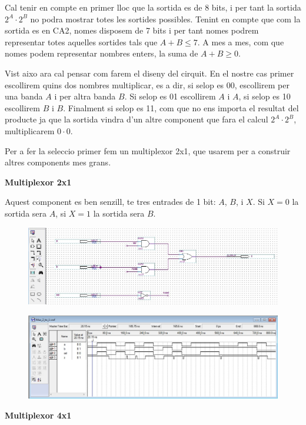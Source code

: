 \documentclass[12pt, a4papre]{article}
\begin{document}
	Cal tenir en compte en primer lloc que la sortida es de 8 bits, i per tant la sortida $2^A\cdot2^B$ no podra mostrar totes les sortides possibles. Tenint en compte que com la sortida es en CA2, nomes disposem de 7 bits i per tant nomes podrem representar totes aquelles sortides tals que $A+B \leqslant 7$. A mes a mes, com que nomes podem representar nombres enters, la suma de $A+B \geqslant 0$. 
	
	Vist aixo ara cal pensar com farem el diseny del cirquit. En el nostre cas primer escollirem quins dos nombres multiplicar, es a dir, si selop es 00, escollirem per una banda $A$ i per altra banda $B$. Si selop es 01 escollirem $A$ i $A$, si selop es 10 escollirem $B$ i $B$. Finalment si selop es 11, com que no ens importa el resultat del producte ja que la sortida vindra d'un altre component que fara el calcul $2^A\cdot2^B$, multiplicarem $0\cdot 0$.
	
	Per a fer la seleccio primer fem un multiplexor 2x1, que usarem per a construir altres components mes grans.
	
	\textbf{\large{Multiplexor 2x1}}
	
	Aquest component es ben senzill, te tres entrades de 1 bit: $A$, $B$, i $X$. Si $X=0$ la sortida sera $A$, si $X=1$ la sortida sera $B$.
	
		\begin{center}
	\begin{figure}[H]
		\begin{center}
		\includegraphics[width=150mm]{multiplexor2_1.jpeg}
		\end{center}
	\end{figure}
	
	\end{center}
	
	\begin{center}
	\begin{figure}[H]
		\begin{center}
		\includegraphics[width=150mm]{simulaciofeta.jpeg}
		\end{center}
	\end{figure}
	
	\end{center}
	\textbf{\large{Multiplexor 4x1}}
	
\end{document}
